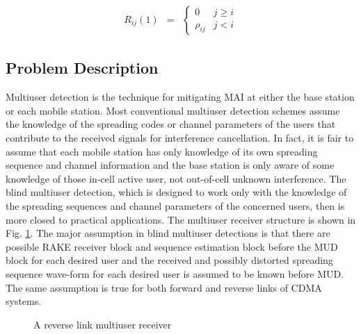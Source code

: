 \documentclass[a4paper,11pt,fleqn]{article}
\begin{document}
\begin{equation}
\begin{array}{rcl}
R_{ij}(1)&=&\left\{
\begin{array}{ll}
0&j\geq i\\ \rho_{ij}&j<i
\end{array}\right.
\end{array}
\end{equation}

\subsection{Problem Description}

Multiuser detection is the technique for mitigating MAI at either
the base station or each mobile station. Most conventional
multiuser detection schemes assume the knowledge of the spreading
codes or channel parameters of the users that contribute to the
received signals for interference cancellation. In fact, it is
fair to assume that each mobile station has only knowledge of its
own spreading sequence and channel information and the base
station is only aware of some knowledge of those in-cell active
user, not out-of-cell unknown interference. The blind multiuser
detection, which is designed to work only with the knowledge of
the spreading sequences and channel parameters of the concerned
users, then is more closed to practical applications. The
multiuser receiver structure is shown in Fig. \ref{CDMA_links}.
The major assumption in blind multiuser detections is that there
are possible RAKE receiver block and sequence estimation block
before the MUD block for each desired user and the received and
possibly distorted spreading sequence wave-form for each desired
user is assumed to be known before MUD. The same assumption is
true for both forward and reverse links of CDMA systems.

\begin{figure}
\caption{A reverse link multiuser receiver}\label{CDMA_links}
\end{figure}
\end{document}
